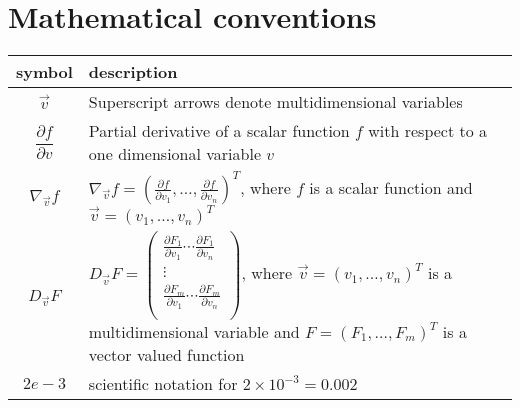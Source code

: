 \section*{Mathematical conventions}

\begin{table}[h!]
\centering
\begin{tabular}{c p{10cm}} %
\hline
symbol & description \\ \hline
$\vec{v}$ & Superscript arrows denote multidimensional variables \\[0.5em] 
$\dfrac{\partial f}{\partial v}$ & Partial derivative of a scalar function $f$ with respect to a one dimensional variable $v$ \\[0.5em] 
$\nabla_{\vec{v}} f$  & $\nabla_{\vec{v}} f = (\frac{\partial f}{\partial v_1}, \ldots, \frac{\partial f}{\partial v_n})^T$, where $f$ is a scalar function and $\vec{v} = (v_1, \ldots, v_n)^T$  \\[0.5em]
$D_{\vec{v}} F$ & $D_{\vec{v}} F = \begin{pmatrix}
    \frac{\partial F_1}{\partial v_1} \cdots \frac{\partial F_1}{\partial v_n} \\
    \vdots \\
    \frac{\partial F_m}{\partial v_1} \cdots \frac{\partial F_m}{\partial v_n} \\
\end{pmatrix}$, where $\vec{v} = (v_1, \ldots, v_n)^T$ is a multidimensional variable and $F = (F_1, \ldots, F_m)^T$ is a vector valued function \\
$2e-3$ & scientific notation for $2 \times 10^{-3} = 0.002$ \\
\hline
\end{tabular}
\end{table}